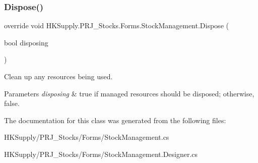 \subsubsection{\texorpdfstring{Dispose()}{Dispose()}}
{\footnotesize\ttfamily override void H\+K\+Supply.\+P\+R\+J\+\_\+\+Stocks.\+Forms.\+Stock\+Management.\+Dispose (\begin{DoxyParamCaption}\item[{bool}]{disposing }\end{DoxyParamCaption})\hspace{0.3cm}{\ttfamily [protected]}}



Clean up any resources being used. 


\begin{DoxyParams}{Parameters}
{\em disposing} & true if managed resources should be disposed; otherwise, false.\\
\hline
\end{DoxyParams}


The documentation for this class was generated from the following files\+:\begin{DoxyCompactItemize}
\item 
H\+K\+Supply/\+P\+R\+J\+\_\+\+Stocks/\+Forms/Stock\+Management.\+cs\item 
H\+K\+Supply/\+P\+R\+J\+\_\+\+Stocks/\+Forms/Stock\+Management.\+Designer.\+cs\end{DoxyCompactItemize}
